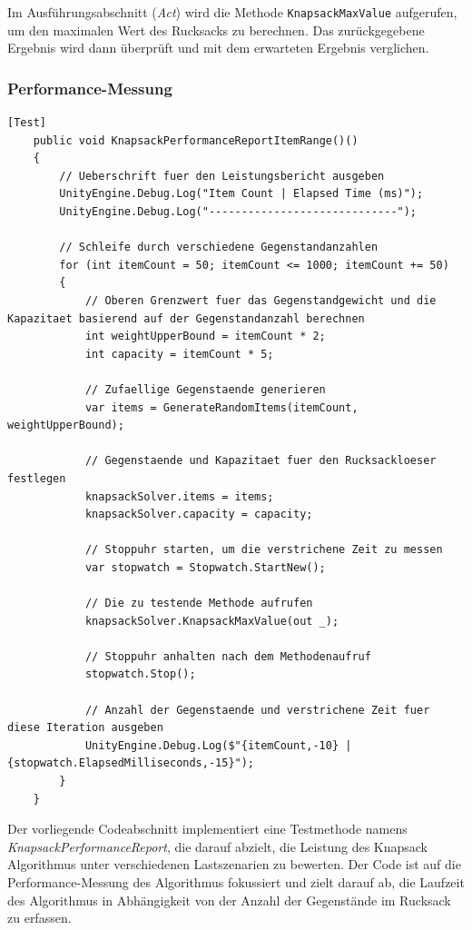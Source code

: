 \begin{itemize}
Im Ausführungsabschnitt (\textit{Act}) wird die Methode \texttt{KnapsackMaxValue} aufgerufen, um den maximalen Wert des Rucksacks zu berechnen. Das zurückgegebene Ergebnis wird dann überprüft und mit dem erwarteten Ergebnis verglichen.

\subsubsection{Performance-Messung}

\begin{lstlisting}[style=csharp, caption={Codeabschnitt: Performance Messung bei hoher Anzahl an Gegenständen}, label={code:performanceRange}]
    [Test]
    public void KnapsackPerformanceReportItemRange()()
    {
        // Ueberschrift fuer den Leistungsbericht ausgeben
        UnityEngine.Debug.Log("Item Count | Elapsed Time (ms)");
        UnityEngine.Debug.Log("-----------------------------");

        // Schleife durch verschiedene Gegenstandanzahlen
        for (int itemCount = 50; itemCount <= 1000; itemCount += 50)
        {
            // Oberen Grenzwert fuer das Gegenstandgewicht und die Kapazitaet basierend auf der Gegenstandanzahl berechnen
            int weightUpperBound = itemCount * 2;
            int capacity = itemCount * 5;

            // Zufaellige Gegenstaende generieren
            var items = GenerateRandomItems(itemCount, weightUpperBound);

            // Gegenstaende und Kapazitaet fuer den Rucksackloeser festlegen
            knapsackSolver.items = items;
            knapsackSolver.capacity = capacity;

            // Stoppuhr starten, um die verstrichene Zeit zu messen
            var stopwatch = Stopwatch.StartNew();

            // Die zu testende Methode aufrufen
            knapsackSolver.KnapsackMaxValue(out _);

            // Stoppuhr anhalten nach dem Methodenaufruf
            stopwatch.Stop();

            // Anzahl der Gegenstaende und verstrichene Zeit fuer diese Iteration ausgeben
            UnityEngine.Debug.Log($"{itemCount,-10} | {stopwatch.ElapsedMilliseconds,-15}");
        }
    }
\end{lstlisting}

Der vorliegende Codeabschnitt implementiert eine Testmethode namens \textit{KnapsackPerformanceReport}, die darauf abzielt, die Leistung des Knapsack Algorithmus unter verschiedenen Lastszenarien zu bewerten. Der Code ist auf die Performance-Messung des Algorithmus fokussiert und zielt darauf ab, die Laufzeit des Algorithmus in Abhängigkeit von der Anzahl der Gegenstände im Rucksack zu erfassen.


\end{itemize}
